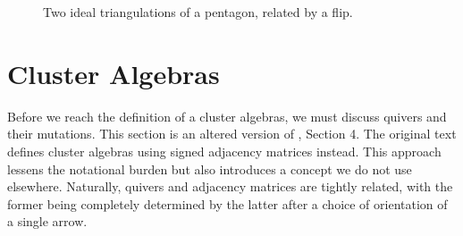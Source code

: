 \documentclass[a4paper,oneside,svgnames,draft]{amsart}
\theoremstyle{plain}
\theoremstyle{definition}
\begin{document}
 \begin{figure}[ht]
  \centering
  \begin{subfigure}{.3\textwidth}
   \centering
  \end{subfigure}
  \begin{subfigure}{.3\textwidth}
   \centering
  \end{subfigure}
  \caption{Two ideal triangulations of a pentagon, related by a flip.}
  \label{fig:flip-pentagon}
 \end{figure}

 \section{Cluster Algebras}
 \label{sec:cluster-algebras}

 Before we reach the definition of a cluster algebras, we must discuss quivers
 and their mutations. This section is an altered version of \cite{ot}, Section
 4. The original text defines cluster algebras using signed adjacency matrices
 instead. This approach lessens the notational burden but also introduces a
 concept we do not use elsewhere. Naturally, quivers and adjacency matrices are
 tightly related, with the former being completely determined by the latter
 after a choice of orientation of a single arrow.
\end{document}
